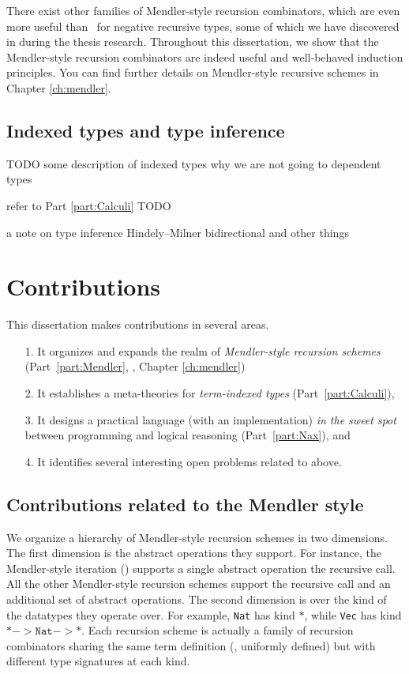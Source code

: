 There exist other families of Mendler-style recursion combinators,
which are even more useful than \MIt\ for negative recursive types,
some of which we have discovered in during the thesis research. Throughout
this dissertation, we show that the Mendler-style recursion combinators are
indeed useful and well-behaved induction principles. You can find
further details on Mendler-style recursive schemes in Chapter \ref{ch:mendler}.

\subsection{Indexed types and type inference}
\label{sec:intro:indexed}
TODO some description of indexed types
why we are not going to dependent types

refer to Part \ref{part:Calculi}
TODO

a note on type inference
Hindely--Milner
bidirectional and other things

\section{Contributions}\label{sec:intro:contrib}
This dissertation makes contributions in several areas.
\begin{itemize}
\item[1.]
It organizes and expands the realm of \emph{Mendler-style recursion schemes}
(Part~\ref{part:Mendler}, \ie, Chapter \ref{ch:mendler})

\item[2.] It establishes a meta-theories for \emph{term-indexed types}
        (Part~\ref{part:Calculi}),

\item[3.] It designs a practical language (with an implementation)
	\emph{in the sweet spot} between programming and logical reasoning
	(Part~\ref{part:Nax}), and

\item[4.] It identifies several interesting open problems related to above.
\end{itemize}

\subsection{Contributions related to the Mendler style}
We organize a hierarchy of Mendler-style recursion schemes in two dimensions.
The first dimension is the abstract operations they support. For instance,
the Mendler-style iteration (\MIt) supports a single abstract operation
the recursive call. All the other Mendler-style recursion schemes
support the recursive call and an additional set of abstract operations. 
The second dimension is over the kind of the datatypes they operate over.
For example, \texttt{Nat} has kind $*$, while \texttt{Vec}
has kind $* -> \mathtt{Nat} -> *$. Each recursion scheme is actually a
family of recursion combinators sharing the same term definition
(\ie, uniformly defined) but with different type signatures at each kind.

